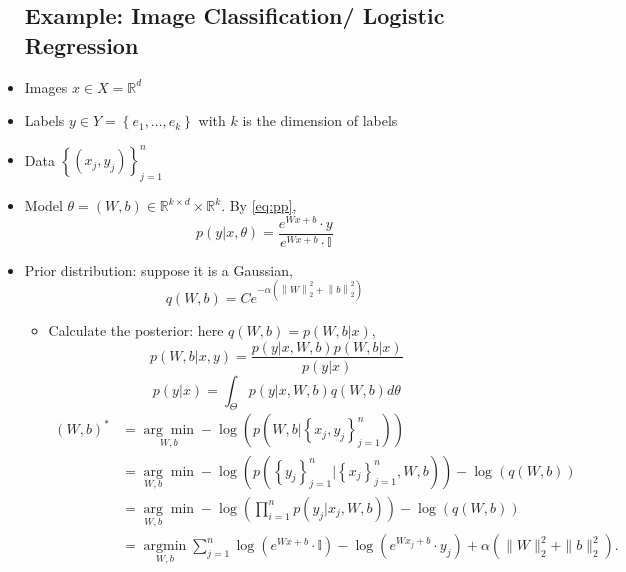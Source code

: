 \begin{itemize}
\subsection{Example: Image  Classification/ Logistic Regression}
\item Images $x \in X=\mathbb{R}^{d}$
\item Labels $y \in Y=\left\{e_{1}, \ldots, e_{k}\right\}$ with $k$ is the dimension of labels
\item Data $\left\{(x_{j},y_{j})\right\}_{j=1}^{n}$
\item Model $\theta=(W, b) \in \mathbb{R}^{k \times d} \times \mathbb{R}^{k}$. By \eqref{eq:pp},
$$
p(y | x, \theta)=\frac{e^{Wx+b} \cdot y}{e^{Wx+b} \cdot \mathbb{I}}
$$
\item Prior distribution: suppose it is a Gaussian,
$$
q(W, b)=C e^{-\alpha\left(\left\|W\right\|_{2}^{2}+ \left\|b\right\|_{2}^{2}\right)}
$$


\begin{itemize}
	\item Calculate the posterior: here $q(W,b)=p(W, b|x)$,
	$$
	p(W, b | x, y)=\frac{p(y | x, W, b) p(W, b|x) }{p(y | x)} 
	$$
	$$
	p(y | x)=\int_{\Theta} p(y|x, W, b) q(W, b) d \theta
	$$
	\begin{align*}
	(W, b)^{*}&=\underset{W,b}{\arg \min }-\log \left( p\left(W, b |\left\{x_{j},y_{j}\right\}_{j=1}^{n}\right)\right) \\
&=\underset {W,b}\arg  \min -\log \left( p\left(\left\lbrace y_{j}\right\rbrace _{j=1}^{n} | \left\lbrace x_{j}\right\rbrace _{j=1}^{n}, W, b\right)\right)-\log (q(W, b))\\
&=\underset {W,b}\arg  \min	-\log \left(\prod_{i=1}^{n} p\left(y_{j} | x_{j}, W, b\right)\right)-\log (q(W, b))\\
&=\underset{W, b}{\operatorname{argmin}} \sum_{j=1}^{n} \log \left(e^{Wx+b} \cdot \mathbb{I}\right)-\log \left(e^{Wx_j+b} \cdot y_{j}\right)+\alpha\left(\|W\|_{2}^{2}+\| b\|_{2}^{2}\right).
	\end{align*}


\end{itemize}

\end{itemize}
